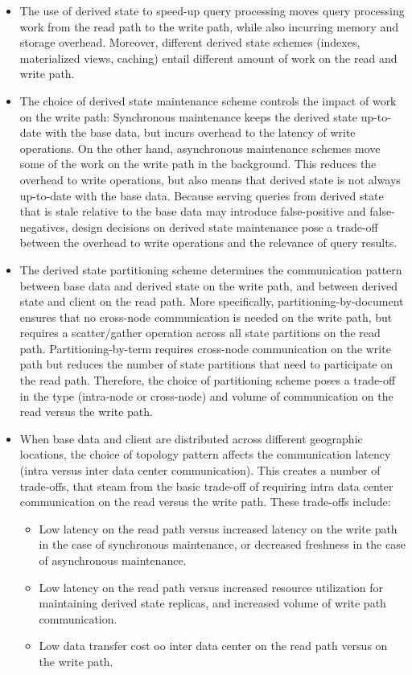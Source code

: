 \begin{itemize}
  \item The use of derived state to speed-up query processing moves query processing work from the read path to the write
  path, while also incurring memory and storage overhead.
  Moreover, different derived state schemes (indexes, materialized views, caching) entail different amount of work
  on the read and write path.

  \item The choice of derived state maintenance scheme controls the impact of work on the write path:
  Synchronous maintenance keeps the derived state up-to-date with the base data,
  but incurs overhead to the latency of write operations.
  On the other hand, asynchronous maintenance schemes move some of the work on the write path in the background.
  This reduces the overhead to write operations, but also means that derived state is not always up-to-date with the base
  data.
  Because serving queries from derived state that is stale relative to the base data may introduce false-positive and
  false-negatives,
  design decisions on derived state maintenance pose a trade-off between the overhead to write operations
  and the relevance of query results.

  \item The derived state partitioning scheme determines the communication pattern between base data and derived state
  on the write path, and between derived state and client on the read path.
  More specifically, partitioning-by-document ensures that no cross-node communication is needed on the write path,
  but requires a scatter/gather operation across all state partitions on the read path.
  Partitioning-by-term requires cross-node communication on the write path but reduces the number of state partitions
  that need to participate on the read path.
  Therefore, the choice of partitioning scheme poses a trade-off in the type (intra-node or cross-node) and volume
  of communication on the read versus the write path.

  \item When base data and client are distributed across different geographic locations,
  the choice of topology pattern affects the communication latency (intra versus inter data center communication).
  This creates a number of trade-offs, that steam from the basic trade-off of requiring intra data center communication
  on the read versus the write path.
  These trade-offs include:
  \begin{itemize}
    \item Low latency on the read path versus increased latency on the write path in the case of synchronous maintenance,
    or decreased freshness in the case of asynchronous maintenance.
    \item Low latency on the read path versus increased resource utilization for maintaining derived state replicas,
    and increased volume of write path communication.
    \item Low data transfer cost oo inter data center on the read path versus on the write path.
  \end{itemize}

\end{itemize}





